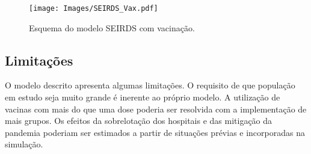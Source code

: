 \begin{figure}[H]\centering
        \texttt{[image: Images/SEIRDS\_Vax.pdf]}
        \caption{Esquema do modelo SEIRDS com vacinação.}
\label{fig:ModelVax}\end{figure}

\subsection{Limitações}
O modelo descrito apresenta algumas limitações.
O requisito de que população em estudo seja muito grande é inerente ao próprio modelo.
A utilização de vacinas com mais do que uma dose poderia ser resolvida com a implementação de mais grupos.
Os efeitos da sobrelotação dos hospitais e das mitigação da pandemia poderiam ser estimados a partir de situações prévias e incorporadas na simulação.
